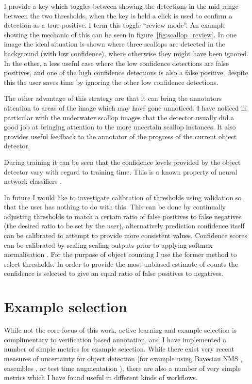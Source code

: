 I provide a key which toggles between showing the detections in the mid range between the two thresholds, when the key is held a click is used to confirm a detection as a true positive. I term this toggle ``review mode''.  An example showing the mechanic of this can be seen in figure~\ref{fig:scallop_review}. In one image the ideal situation is shown where three scallops are detected in the background (with low confidence), where otherwise they might have been ignored. In the other, a less useful case where the low confidence detections are false positives, and one of the high confidence detections is also a false positive, despite this the user saves time by ignoring the other low confidence detections.

The other advantage of this strategy are that it can bring the annotators attention to areas of the image which may have gone unnoticed. I have noticed in particular with the underwater scallop images that the detector usually did a good job at bringing attention to the more uncertain scallop instances. It also provides useful feedback to the annotator of the progress of the current object detector. 

During training it can be seen that the confidence levels provided by the object detector vary with regard to training time. This is a known property of neural network classifiers \cite{Guo2017}.

In future I would like to investigate calibration of thresholds using validation so that the user has nothing to do with this. This can be done by continually adjusting thresholds to match a certain ratio of false positives to false negatives (the desired ratio to be set by the user), alternatively prediction confidence itself can be calibrated to attempt to provide more consistent values. Confidence scores can be calibrated by scaling scaling outputs prior to applying softmax normalisation \cite{Guo2017}. For the purpose of object counting I use the former method to select thresholds. In order to provide the most unbiased estimate of counts the confidence is selected to give an equal ratio of false positives to negatives.
 


\section{Example selection}
\label{sec:example_selection}

While not the core focus of this work, active learning and example selection is complimentary to verification based annotation, and I have implemented a number of simple metrics for example selection. While there exist very recent measures of uncertainty for object detection (for example using Bayesian \gls{NMS} \cite{Harakeh}, ensembles \cite{Le2018}, or test time augmentation \cite{Wei2018}), there are also a number of very simple metrics which I have found useful in different kinds of workflows. 

